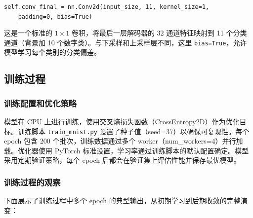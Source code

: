 \documentclass[a4paper]{article}
\begin{document}
\begin{lstlisting}
self.conv_final = nn.Conv2d(input_size, 11, kernel_size=1, 
    padding=0, bias=True)
\end{lstlisting}

这是一个标准的 $1 \times 1$ 卷积，将最后一层解码器的 32 通道特征映射到 11 个分类通道（背景加 10 个数字类）。与下采样和上采样层不同，这里 \texttt{bias=True}，允许模型学习每个类别的分类偏差。

\subsection{训练过程}


\subsubsection{训练配置和优化策略}

模型在 CPU 上进行训练，使用交叉熵损失函数（CrossEntropy2D）作为优化目标。训练脚本 \texttt{train\_mnist.py} 设置了种子值（seed=37）以确保可复现性。每个 epoch 包含 200 个批次，训练数据通过多个 worker（num\_workers=4）并行加载。优化器使用 PyTorch 标准设置，学习率通过训练脚本的默认配置确定。模型采用定期验证策略，每个 epoch 后都会在验证集上评估性能并保存最优模型。

\subsubsection{训练过程的观察}

下面展示了训练过程中多个 epoch 的典型输出，从初期学习到后期收敛的完整演变：
\end{document}
